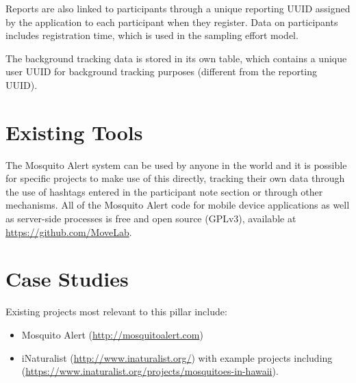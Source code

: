 \documentclass[]{article}
\begin{document}
Reports are also linked to participants through a unique reporting UUID assigned by the application to each participant when they register. Data on participants includes registration time, which is used in the sampling effort model.

The background tracking data is stored in its own table, which contains a unique user UUID for background tracking purposes (different from the reporting UUID).

\hypertarget{existing-tools}{%
\section{Existing Tools}\label{existing-tools}}

The Mosquito Alert system can be used by anyone in the world and it is possible for specific projects to make use of this directly, tracking their own data through the use of hashtags entered in the participant note section or through other mechanisms. All of the Mosquito Alert code for mobile device applications as well as server-side processes is free and open source (GPLv3), available at \url{https://github.com/MoveLab}.

\hypertarget{case-studies}{%
\section{Case Studies}\label{case-studies}}

Existing projects most relevant to this pillar include:

\begin{itemize}
\item
  Mosquito Alert (\url{http://mosquitoalert.com})
\item
  iNaturalist (\url{http://www.inaturalist.org/}) with example projects including (\url{https://www.inaturalist.org/projects/mosquitoes-in-hawaii}).
\end{itemize}


\end{document}
